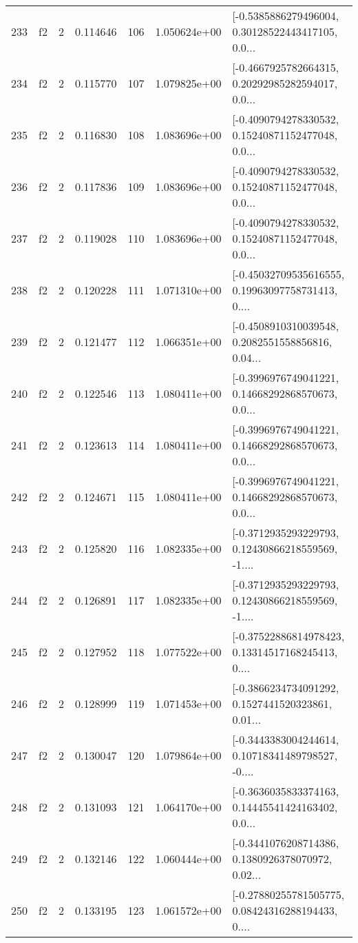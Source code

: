 \begin{tabular}{lllrlrl}
233 &  f2 &   2 &  0.114646 &  106 &  1.050624e+00 &  [-0.5385886279496004, 0.30128522443417105, 0.0... \\
234 &  f2 &   2 &  0.115770 &  107 &  1.079825e+00 &  [-0.4667925782664315, 0.20292985282594017, 0.0... \\
235 &  f2 &   2 &  0.116830 &  108 &  1.083696e+00 &  [-0.4090794278330532, 0.15240871152477048, 0.0... \\
236 &  f2 &   2 &  0.117836 &  109 &  1.083696e+00 &  [-0.4090794278330532, 0.15240871152477048, 0.0... \\
237 &  f2 &   2 &  0.119028 &  110 &  1.083696e+00 &  [-0.4090794278330532, 0.15240871152477048, 0.0... \\
238 &  f2 &   2 &  0.120228 &  111 &  1.071310e+00 &  [-0.45032709535616555, 0.19963097758731413, 0.... \\
239 &  f2 &   2 &  0.121477 &  112 &  1.066351e+00 &  [-0.4508910310039548, 0.2082551558856816, 0.04... \\
240 &  f2 &   2 &  0.122546 &  113 &  1.080411e+00 &  [-0.3996976749041221, 0.14668292868570673, 0.0... \\
241 &  f2 &   2 &  0.123613 &  114 &  1.080411e+00 &  [-0.3996976749041221, 0.14668292868570673, 0.0... \\
242 &  f2 &   2 &  0.124671 &  115 &  1.080411e+00 &  [-0.3996976749041221, 0.14668292868570673, 0.0... \\
243 &  f2 &   2 &  0.125820 &  116 &  1.082335e+00 &  [-0.3712935293229793, 0.12430866218559569, -1.... \\
244 &  f2 &   2 &  0.126891 &  117 &  1.082335e+00 &  [-0.3712935293229793, 0.12430866218559569, -1.... \\
245 &  f2 &   2 &  0.127952 &  118 &  1.077522e+00 &  [-0.37522886814978423, 0.13314517168245413, 0.... \\
246 &  f2 &   2 &  0.128999 &  119 &  1.071453e+00 &  [-0.3866234734091292, 0.1527441520323861, 0.01... \\
247 &  f2 &   2 &  0.130047 &  120 &  1.079864e+00 &  [-0.3443383004244614, 0.10718341489798527, -0.... \\
248 &  f2 &   2 &  0.131093 &  121 &  1.064170e+00 &  [-0.3636035833374163, 0.14445541424163402, 0.0... \\
249 &  f2 &   2 &  0.132146 &  122 &  1.060444e+00 &  [-0.3441076208714386, 0.1380926378070972, 0.02... \\
250 &  f2 &   2 &  0.133195 &  123 &  1.061572e+00 &  [-0.27880255781505775, 0.08424316288194433, 0.... \\

\end{tabular}
